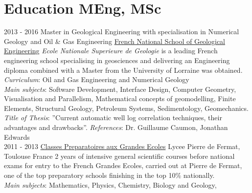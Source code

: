 \documentclass[]{friggeri-cv}
\begin{document}
\section{Education MEng, MSc}
\begin{entrylist}
  \entry
    {2013 - 2016}
    {Master in Geological Engineering with specialisation in Numerical Geology and Oil \& Gas Engineering}
    {\href{http://ensg.univ-lorraine.fr/english/}{French National School of Geological Engineering}}
    {\emph{Ecole Nationale Superieure de Geologie} is a leading French engineering school specialising in geosciences and delivering an Engineering diploma combined with a Master from the University of Lorraine was obtained.\\ \emph{Curriculum}: Oil and Gas Engineering and Numerical Geology\\ 
    \emph{Main subjects}:  Software Development, Interface Design, Computer Geometry, Visualisation and Parallelism, Mathematical concepts of geomodelling, Finite Elements, Structural Geology, Petroleum Systems, Sedimentology, Geomechanics.\\
    \emph{Title of Thesis}: ”Current automatic well log correlation techniques, their advantages and drawbacks”.
    \emph{References}: Dr. Guillaume Caumon, Jonathan Edwards\\}
  \entry
    {2011 - 2013}
    {\href{https://en.wikipedia.org/wiki/Classe_preparatoire_aux_grandes_ecoles}{Classes Preparatoires aux Grandes Ecoles}}
    {Lycee Pierre de Fermat, Toulouse France}
    {2 years of intensive general scientific courses before national exams for entry to the French Grandes Ecoles, carried out at Pierre de Fermat, one of the top preparatory schools finishing in the top 10\% nationally.\\ 
    \emph{Main subjects}: Mathematics, Physics, Chemistry, Biology and Geology, \\}
\end{entrylist}
\vspace*{\fill}
\end{document}
